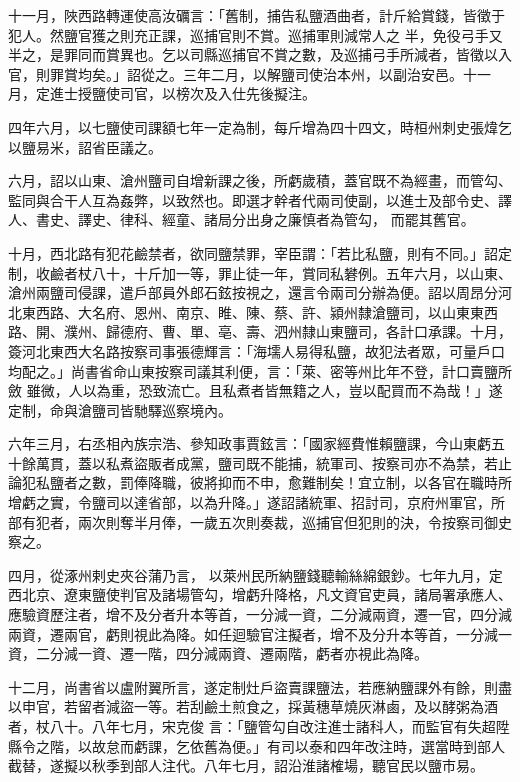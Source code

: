 \begin{pinyinscope}
 十一月，陜西路轉運使高汝礪言：「舊制，捕告私鹽酒曲者，計斤給賞錢，皆徵于犯人。然鹽官獲之則充正課，巡捕官則不賞。巡捕軍則減常人之
 半，免役弓手又半之，是罪同而賞異也。乞以司縣巡捕官不賞之數，及巡捕弓手所減者，皆徵以入官，則罪賞均矣。」詔從之。三年二月，以解鹽司使治本州，以副治安邑。十一月，定進士授鹽使司官，以榜次及入仕先後擬注。



 四年六月，以七鹽使司課額七年一定為制，每斤增為四十四文，時桓州刺史張煒乞以鹽易米，詔省臣議之。



 六月，詔以山東、滄州鹽司自增新課之後，所虧歲積，蓋官既不為經畫，而管勾、監同與合干人互為姦弊，以致然也。即選才幹者代兩司使副，以進士及部令史、譯人、書史、譯史、律科、經童、諸局分出身之廉慎者為管勾，
 而罷其舊官。



 十月，西北路有犯花鹼禁者，欲同鹽禁罪，宰臣謂：「若比私鹽，則有不同。」詔定制，收鹼者杖八十，十斤加一等，罪止徒一年，賞同私礬例。五年六月，以山東、滄州兩鹽司侵課，遣戶部員外郎石鉉按視之，還言令兩司分辦為便。詔以周昂分河北東西路、大名府、恩州、南京、睢、陳、蔡、許、潁州隸滄鹽司，以山東東西路、開、濮州、歸德府、曹、單、亳、壽、泗州隸山東鹽司，各計口承課。十月，簽河北東西大名路按察司事張德輝言：「海壖人易得私鹽，故犯法者眾，可量戶口均配之。」尚書省命山東按察司議其利便，言：「萊、密等州比年不登，計口賣鹽所斂
 雖微，人以為重，恐致流亡。且私煮者皆無籍之人，豈以配買而不為哉！」遂定制，命與滄鹽司皆馳驛巡察境內。



 六年三月，右丞相內族宗浩、參知政事賈鉉言：「國家經費惟賴鹽課，今山東虧五十餘萬貫，蓋以私煮盜販者成黨，鹽司既不能捕，統軍司、按察司亦不為禁，若止論犯私鹽者之數，罰俸降職，彼將抑而不申，愈難制矣！宜立制，以各官在職時所增虧之實，令鹽司以達省部，以為升降。」遂詔諸統軍、招討司，京府州軍官，所部有犯者，兩次則奪半月俸，一歲五次則奏裁，巡捕官但犯則的決，令按察司御史察之。



 四月，從涿州剌史夾谷蒲乃言，
 以萊州民所納鹽錢聽輸絲綿銀鈔。七年九月，定西北京、遼東鹽使判官及諸場管勾，增虧升降格，凡文資官吏員，諸局署承應人、應驗資歷注者，增不及分者升本等首，一分減一資，二分減兩資，遷一官，四分減兩資，遷兩官，虧則視此為降。如任迴驗官注擬者，增不及分升本等首，一分減一資，二分減一資、遷一階，四分減兩資、遷兩階，虧者亦視此為降。



 十二月，尚書省以盧附翼所言，遂定制灶戶盜賣課鹽法，若應納鹽課外有餘，則盡以申官，若留者減盜一等。若刮鹼土煎食之，採黃穗草燒灰淋鹵，及以酵粥為酒者，杖八十。八年七月，宋克俊
 言：「鹽管勾自改注進士諸科人，而監官有失超陞縣令之階，以故怠而虧課，乞依舊為便。」有司以泰和四年改注時，選當時到部人截替，遂擬以秋季到部人注代。八年七月，詔沿淮諸榷場，聽官民以鹽市易。




\end{pinyinscope}
